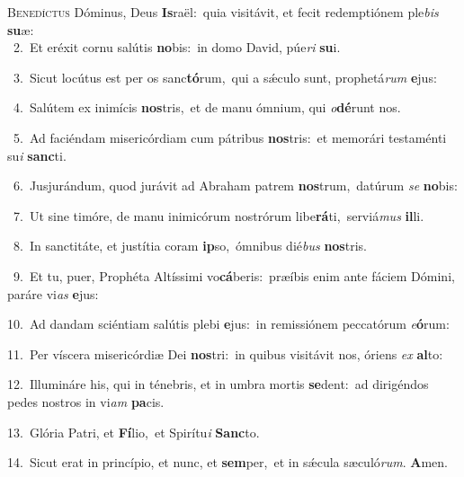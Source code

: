 \lettrine{\initial\textcolor{\initialcolor}{B}}{enedíctus} Dóminus, Deus \textbf{Is}\-raël:~\star quia visitávit, et fecit redemptiónem ple\textit{bis} \textbf{su}\-æ:\\
{\numbfont\textcolor{\numbcolor}{~2.}}~Et eréxit cornu salútis \textbf{no}\-bis:~\star in domo David, púe\textit{ri} \textbf{su}\-i.\par
{\numbfont\textcolor{\numbcolor}{~3.}}~Sicut locútus est per os sanc\-\textbf{tó}\-rum,~\star qui a sǽculo sunt, prophetá\textit{rum} \textbf{e}\-jus:\par
{\numbfont\textcolor{\numbcolor}{~4.}}~Salútem ex inimícis \textbf{nos}\-tris,~\star et de manu ómnium, qui \textit{o}\-\textbf{dé}runt nos.\par
{\numbfont\textcolor{\numbcolor}{~5.}}~Ad faciéndam misericórdiam cum pátribus \textbf{nos}\-tris:~\star et memorári testaménti su\textit{i} \textbf{sanc}\-ti.\par
{\numbfont\textcolor{\numbcolor}{~6.}}~Jusjurándum, quod jurávit ad Abraham patrem \textbf{nos}\-trum,~\star datúrum \textit{se} \textbf{no}\-bis:\par
{\numbfont\textcolor{\numbcolor}{~7.}}~Ut sine timóre, de manu inimicórum nostrórum libe\-\textbf{rá}\-ti,~\star serviá\textit{mus} \textbf{il}\-li.\par
{\numbfont\textcolor{\numbcolor}{~8.}}~In sanctitáte, et justítia coram \textbf{ip}\-so,~\star ómnibus dié\textit{bus} \textbf{nos}\-tris.\par
{\numbfont\textcolor{\numbcolor}{~9.}}~Et tu, puer, Prophéta Altíssimi vo\-\textbf{cá}\-beris:~\star præíbis enim ante fáciem Dómini, paráre vi\textit{as} \textbf{e}\-jus:\par
{\numbfont\textcolor{\numbcolor}{10.}}~Ad dandam sciéntiam salútis plebi \textbf{e}\-jus:~\star in remissiónem peccatórum \textit{e}\-\textbf{ó}rum:\par
{\numbfont\textcolor{\numbcolor}{11.}}~Per víscera misericórdiæ Dei \textbf{nos}\-tri:~\star in quibus visitávit nos, óriens \textit{ex} \textbf{al}\-to:\par
{\numbfont\textcolor{\numbcolor}{12.}}~Illumináre his, qui in ténebris, et in umbra mortis \textbf{se}\-dent:~\star ad dirigéndos pedes nostros in vi\textit{am} \textbf{pa}\-cis.\par
{\numbfont\textcolor{\numbcolor}{13.}}~Glória Patri, et \textbf{Fí}\-lio,~\star et Spirítu\textit{i} \textbf{Sanc}\-to.\par
{\numbfont\textcolor{\numbcolor}{14.}}~Sicut erat in princípio, et nunc, et \textbf{sem}\-per,~\star et in sǽcula sæculó\-\textit{rum}\-. \textbf{A}\-men.\par
